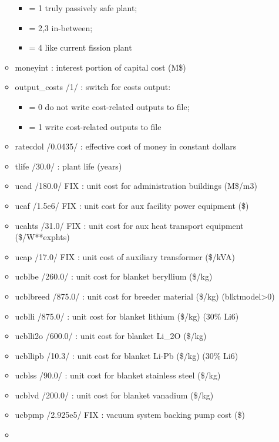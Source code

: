 \documentclass[
]{article}
\providecommand{\tightlist}{%
  \setlength{\itemsep}{0pt}\setlength{\parskip}{0pt}}
\begin{document}
\begin{itemize}
\begin{itemize}
    \begin{itemize}
    \tightlist
    \item
      = 1 truly passively safe plant;
    \item
      = 2,3 in-between;
    \item
      = 4 like current fission plant
    \end{itemize}
  \item
    moneyint : interest portion of capital cost (M\$)
  \item
    output\_costs /1/ : switch for costs output:

    \begin{itemize}
    \tightlist
    \item
      = 0 do not write cost-related outputs to file;
    \item
      = 1 write cost-related outputs to file
    \end{itemize}
  \item
    ratecdol /0.0435/ : effective cost of money in constant dollars
  \item
    tlife /30.0/ : plant life (years)
  \item
    ucad /180.0/ FIX : unit cost for administration buildings (M\$/m3)
  \item
    ucaf /1.5e6/ FIX : unit cost for aux facility power equipment (\$)
  \item
    ucahts /31.0/ FIX : unit cost for aux heat transport equipment
    (\$/W**exphts)
  \item
    ucap /17.0/ FIX : unit cost of auxiliary transformer (\$/kVA)
  \item
    ucblbe /260.0/ : unit cost for blanket beryllium (\$/kg)
  \item
    ucblbreed /875.0/ : unit cost for breeder material (\$/kg)
    (blktmodel\textgreater0)
  \item
    ucblli /875.0/ : unit cost for blanket lithium (\$/kg) (30\% Li6)
  \item
    ucblli2o /600.0/ : unit cost for blanket Li\_2O (\$/kg)
  \item
    ucbllipb /10.3/ : unit cost for blanket Li-Pb (\$/kg) (30\% Li6)
  \item
    ucblss /90.0/ : unit cost for blanket stainless steel (\$/kg)
  \item
    ucblvd /200.0/ : unit cost for blanket vanadium (\$/kg)
  \item
    ucbpmp /2.925e5/ FIX : vacuum system backing pump cost (\$)
  \item

\end{itemize}
\end{itemize}
\end{document}
